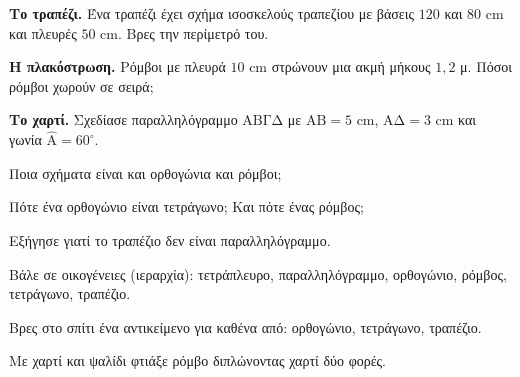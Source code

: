 \ex \textbf{Το τραπέζι.} Ένα τραπέζι έχει σχήμα ισοσκελούς τραπεζίου με βάσεις $120$ και $80$ cm και πλευρές $50$ cm. Βρες την περίμετρό του.

\ex \textbf{Η πλακόστρωση.} Ρόμβοι με πλευρά $10$ cm στρώνουν μια ακμή μήκους $1{,}2$ μ. Πόσοι ρόμβοι χωρούν σε σειρά;

\ex \textbf{Το χαρτί.} Σχεδίασε παραλληλόγραμμο $\mathrm{ΑΒΓΔ}$ με $\mathrm{ΑΒ}=5$ cm, $\mathrm{ΑΔ}=3$ cm και γωνία $\hat{\mathrm{Α}}=60^\circ$.


\ex Ποια σχήματα είναι και ορθογώνια και ρόμβοι;

\ex Πότε ένα ορθογώνιο είναι τετράγωνο; Και πότε ένας ρόμβος;

\ex Εξήγησε γιατί το τραπέζιο δεν είναι παραλληλόγραμμο.

\ex Βάλε σε οικογένειες (ιεραρχία): τετράπλευρο, παραλληλόγραμμο, ορθογώνιο, ρόμβος, τετράγωνο, τραπέζιο.


\ex Βρες στο σπίτι ένα αντικείμενο για καθένα από: ορθογώνιο, τετράγωνο, τραπέζιο.

\ex Με χαρτί και ψαλίδι φτιάξε ρόμβο διπλώνοντας χαρτί δύο φορές.
